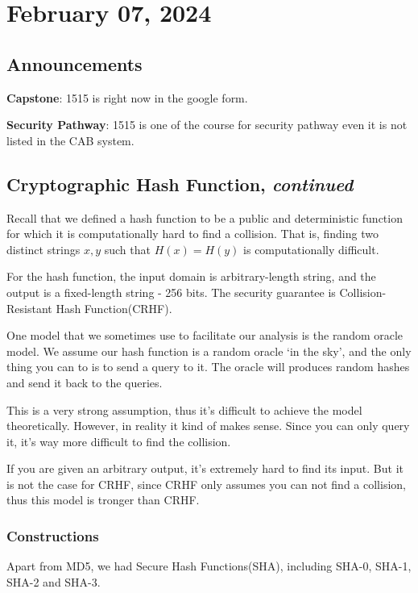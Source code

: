 \section{February 07, 2024}
\label{20240207}
\subsection{Announcements}
\textbf{Capstone}: 1515 is right now in the google form. 

\textbf{Security Pathway}: 1515 is one of the course for security pathway even it is not listed in the CAB system.

\subsection{Cryptographic Hash Function, \emph{continued}}
Recall that we defined a hash function to be a public and deterministic function for which it is computationally hard to find a collision. That is, finding two distinct strings $x, y$ such that $H(x) = H(y)$ is computationally difficult.

For the hash function, the input domain is arbitrary-length string, and the output is a fixed-length string - 256 bits. The security guarantee is Collision-Resistant Hash Function(CRHF).

One model that we sometimes use to facilitate our analysis is the random oracle model. We assume our hash function is a random oracle `in the sky', and the only thing you can to is to send a query to it. The oracle will produces random hashes and send it back to the queries.

This is a very strong assumption, thus it's difficult to achieve the model theoretically. However, in reality it kind of makes sense. Since you can only query it, it's way more difficult to find the collision.

If you are given an arbitrary output, it's extremely hard to find its input. But it is not the case for CRHF, since CRHF only assumes you can not find a collision, thus this model is tronger than CRHF.


\subsubsection{Constructions}
Apart from MD5, we had Secure Hash Functions(SHA), including SHA-0, SHA-1, SHA-2 and SHA-3.

